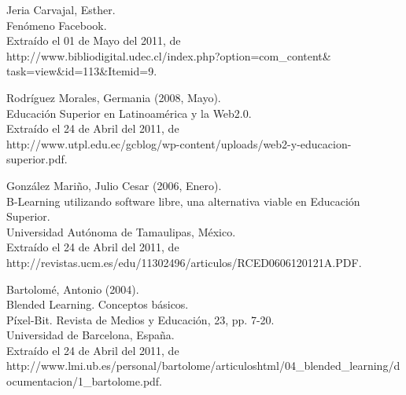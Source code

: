 \documentclass[letterpaper,11pt]{article}
\begin{document}
\begin{thebibliography}{99}

 Jeria Carvajal, Esther.\\
Fenómeno Facebook.\\
Extraído el 01 de Mayo del 2011, de\\
http://www.bibliodigital.udec.cl/index.php?option=com\_content\& task=view\&id=113\&Itemid=9.

 Rodríguez Morales, Germania (2008, Mayo).\\
Educación Superior en Latinoamérica y la Web2.0.\\
Extraído el 24 de Abril del 2011, de\\
http://www.utpl.edu.ec/gcblog/wp-content/uploads/web2-y-educacion-superior.pdf.

 González Mariño, Julio Cesar (2006, Enero).\\
B-Learning utilizando software libre, una alternativa viable en Educación Superior.\\
Universidad Autónoma de Tamaulipas, México.\\
Extraído el 24 de Abril del 2011, de\\
http://revistas.ucm.es/edu/11302496/articulos/RCED0606120121A.PDF.

 Bartolomé, Antonio (2004).\\
Blended Learning. Conceptos básicos.\\
Píxel-Bit. Revista de Medios y Educación, 23, pp. 7-20.\\
Universidad de Barcelona, España.\\
Extraído el 24 de Abril del 2011, de\\
http://www.lmi.ub.es/personal/bartolome/articuloshtml/04\_blend\-ed\_learning/documentacion/1\_bartolome.pdf.

\end{thebibliography}
\end{document}
